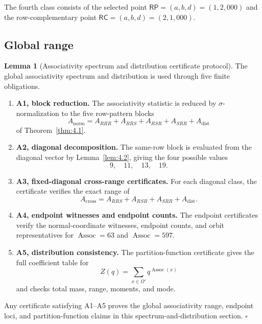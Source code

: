 \documentclass[11pt]{article}
\providecommand{\tightlist}{%
  \setlength{\itemsep}{0pt}\setlength{\parskip}{0pt}}
\theoremstyle{definition}
\newtheorem{lemma}[theorem]{Lemma}
\newcommand{\RP}{\mathsf{RP}}
\newcommand{\RC}{\mathsf{RC}}
\begin{document}
The fourth class consists of the selected point \(\RP=(a,b,d)=(1,2,000)\)
and the row-complementary point \(\RC=(a,b,d)=(2,1,000)\).

\subsection{Global range}\label{assoc-global-range}\label{global-associativity-range}\label{exact-range}

\begin{lemma}[Associativity spectrum and distribution certificate protocol]
\label{lem:5.1}
The
global associativity spectrum and distribution is used through five finite obligations.

\begin{enumerate}
\def\labelenumi{\arabic{enumi}.}
\tightlist
\item
  \textbf{A1, block reduction.} The associativity statistic is reduced
  by \(\sigma\)-normalization to the five row-pattern blocks \[
  A_{\mathrm{norm}}=A_{RRR}+A_{RRS}+A_{RSR}+A_{SRR}+A_{\mathrm{dist}}
  \] of Theorem~\ref{thm:4.1}.
\item
  \textbf{A2, diagonal decomposition.} The same-row block is evaluated
  from the diagonal vector by Lemma~\ref{lem:4.2}, giving the four possible values
  \[
  9,\quad 11,\quad 13,\quad 19.
  \]
\item
  \textbf{A3, fixed-diagonal cross-range certificates.} For each
  diagonal class, the certificate verifies the exact range of \[
  A_{\mathrm{cross}}=A_{RRS}+A_{RSR}+A_{SRR}+A_{\mathrm{dist}}.
  \]
\item
  \textbf{A4, endpoint witnesses and endpoint counts.} The endpoint
  certificates verify the normal-coordinate witnesses, endpoint counts,
  and orbit representatives for \(\operatorname{Assoc}=63\) and
  \(\operatorname{Assoc}=597\).
\item
  \textbf{A5, distribution consistency.} The partition-function
  certificate gives the full coefficient table for \[
  Z(q)=\sum_{x\in\Omega'}q^{\operatorname{Assoc}(x)}
  \] and checks total mass, range, moments, and mode.
\end{enumerate}

Any certificate satisfying A1--A5 proves the global associativity range,
endpoint loci, and partition-function claims in this spectrum-and-distribution section.
\hfill$\square$
\end{lemma}
\end{document}
